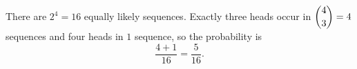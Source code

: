 There are $2^4=16$ equally likely sequences. Exactly three heads occur in $\dbinom43=4$ sequences and four heads in $1$ sequence, so the probability is
\[
\dfrac{4+1}{16}=\boxed{\dfrac{5}{16}}.
\]
